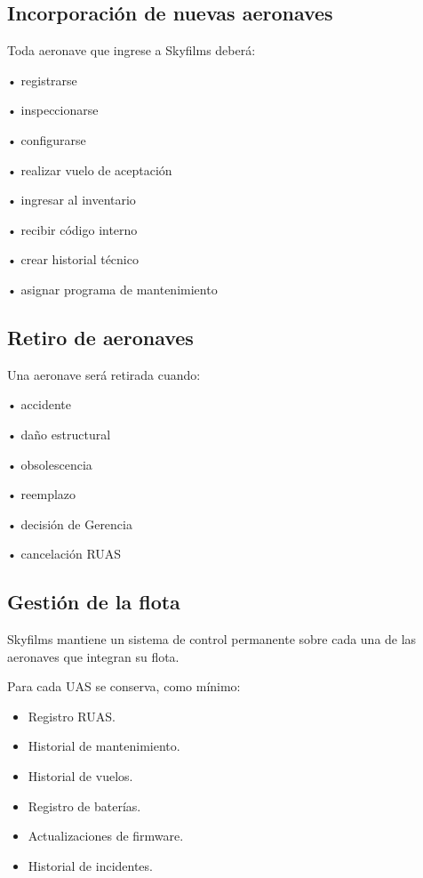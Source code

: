 \subsection{Incorporación de nuevas aeronaves}

Toda aeronave que ingrese a Skyfilms deberá:

• registrarse

• inspeccionarse

• configurarse

• realizar vuelo de aceptación

• ingresar al inventario

• recibir código interno

• crear historial técnico

• asignar programa de mantenimiento

\subsection{Retiro de aeronaves}

Una aeronave será retirada cuando:

• accidente

• daño estructural

• obsolescencia

• reemplazo

• decisión de Gerencia

• cancelación RUAS


\subsection{Gestión de la flota}

Skyfilms mantiene un sistema de control permanente sobre cada una de las aeronaves que integran su flota.

Para cada UAS se conserva, como mínimo:

\begin{itemize}

\item Registro RUAS.

\item Historial de mantenimiento.

\item Historial de vuelos.

\item Registro de baterías.

\item Actualizaciones de firmware.

\item Historial de incidentes.


\end{itemize}



